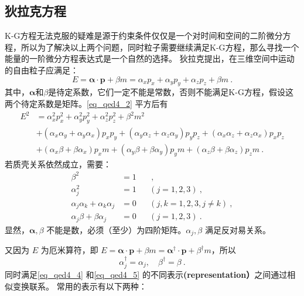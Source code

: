 \subsection{狄拉克方程}
K-G方程无法克服的疑难是源于约束条件仅仅是一个对时间和空间的二阶微分方程，所以为了解决以上两个问题，同时粒子需要继续满足K-G方程，那么寻找一个能量的一阶微分方程表达式是一个自然的选择。
狄拉克提出，在三维空间中运动的自由粒子应满足：
\begin{equation}\label{eq_qed4_2}
E=\boldsymbol{\alpha} \cdot \boldsymbol{p}+\beta m=\alpha_{x} p_{x}+\alpha_{y} p_{y}+\alpha_{z} p_{z}+\beta m~.
\end{equation}
其中，$\boldsymbol {\alpha}$和$\beta$是待定系数，它们一定不能是常数，否则不能满足K-G方程，假设这两个待定系数是矩阵。\autoref{eq_qed4_2} 平方后有
\begin{equation}\label{eq_qed4_3}
\begin{aligned}
E^{2} &=\alpha_{x}^{2} p_{x}^{2}+\alpha_{y}^{2} p_{y}^{2}+\alpha_{z}^{2} p_{z}^{2}+\beta^{2} m^{2} \\
&+\left(\alpha_{x} \alpha_{y}+\alpha_{y} \alpha_{x}\right) p_{x} p_{y}+\left(\alpha_{y} \alpha_{z}+\alpha_{z} \alpha_{y}\right) p_{y} p_{z}+\left(\alpha_{x} \alpha_{z}+\alpha_{z} \alpha_{x}\right) p_{x} p_{z} \\
&+\left(\alpha_{x} \beta+\beta \alpha_{x}\right) p_{x} m+\left(\alpha_{y} \beta+\beta \alpha_{y}\right) p_{y} m+\left(\alpha_{z} \beta+\beta \alpha_{z}\right) p_{z} m~.
\end{aligned}
\end{equation}
若质壳关系依然成立，需要：
\begin{equation}\label{eq_qed4_4}
\begin{aligned}
\beta^{2} &=1 & & ~,\\
\alpha_j^{2} &=1 & &(j=1,2,3) ~,\\
\alpha_j \alpha_k+\alpha_k \alpha_j &=0 & &(j, k=1,2,3, j \neq k) ~,\\
\alpha_j \beta+\beta \alpha_j &=0 & &(j=1,2,3)~.
\end{aligned}
\end{equation}
显然，$\boldsymbol{\alpha}, \beta$ 不能是数，必须（至少）为四阶矩阵。$\alpha_j, \beta$ 满足反对易关系。

又因为 $E$ 为厄米算符，即 $E=\boldsymbol{\alpha} \cdot \boldsymbol{p}+\beta m=\boldsymbol{\alpha}^\dagger \cdot \boldsymbol{p}+\beta^\dagger m$，所以
\begin{equation}\label{eq_qed4_5}
\alpha_j^{\dagger}=\alpha_j, \quad \beta^{\dagger}=\beta~.
\end{equation}
同时满足\autoref{eq_qed4_4} 和\autoref{eq_qed4_5} 的不同表示\textbf{(representation）}之间通过相似变换联系。
常用的表示有以下两种：

